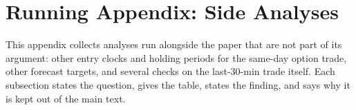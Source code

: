 \ifdefined\runappRpNdays\else\fi

\newsavebox{\runappbox}
\newcommand{\runappfit}[1]{%
  \sbox{\runappbox}{#1}%
  \ifdim\wd\runappbox>\textwidth
    \resizebox{\textwidth}{!}{\usebox{\runappbox}}%
  \else
    \usebox{\runappbox}%
  \fi}

\section{Running Appendix: Side Analyses}
\label{sec:appendix_running}

This appendix collects analyses run alongside the paper that are not part of
its argument: other entry clocks and holding periods for the same-day option
trade, other forecast targets, and several checks on the last-30-min trade
itself. Each subsection states the question, gives the table, states the
finding, and says why it is kept out of the main text.

